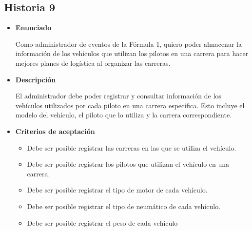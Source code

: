 \documentclass{article}
\begin{document}
	\subsection{Historia 9}
	\begin{itemize}
		
		\item \large{\textbf{Enunciado}}
		\begin{description}
Como administrador de eventos de la Fórmula 1, quiero poder almacenar la información de los vehículos que utilizan los pilotos en una carrera para hacer mejores planes de logística al organizar las carreras.
		\end{description}
		
		\item \large{\textbf{Descripción}}
		\begin{description}
El administrador debe poder registrar y consultar información de los vehículos utilizados por cada piloto en una carrera específica. Esto incluye el modelo del vehículo, el piloto que lo utiliza y la carrera correspondiente. 

		\end{description}
		
		\item \large{\textbf{Criterios de aceptación}}
		\begin{itemize}
			\item Debe ser posible registrar las carreras en las que se utiliza el vehículo.
			\item Debe ser posible registrar los pilotos que utilizan el vehículo en una carrera.
			\item Debe ser posible registrar el tipo de motor de cada vehículo.
			\item Debe ser posible registrar el tipo de neumático de cada vehículo.
			\item Debe ser posible registrar el peso de cada vehículo
			
		\end{itemize}
		
	\end{itemize}
	
\end{document}
